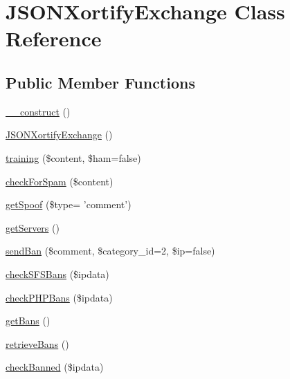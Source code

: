 \hypertarget{class_j_s_o_n_xortify_exchange}{\section{J\-S\-O\-N\-Xortify\-Exchange Class Reference}
\label{class_j_s_o_n_xortify_exchange}
}
\subsection*{Public Member Functions}
\begin{DoxyCompactItemize}
\item 
\hyperlink{class_j_s_o_n_xortify_exchange_a095c5d389db211932136b53f25f39685}{\-\_\-\-\_\-construct} ()
\item 
\hyperlink{class_j_s_o_n_xortify_exchange_a5b94fbd0db11c88aaac5a4d6025957c5}{J\-S\-O\-N\-Xortify\-Exchange} ()
\item 
\hyperlink{class_j_s_o_n_xortify_exchange_a3b3be735e633ba330c6b5d086aa508cd}{training} (\$content, \$ham=false)
\item 
\hyperlink{class_j_s_o_n_xortify_exchange_a7a4f53c3841dc7806455261af557d514}{check\-For\-Spam} (\$content)
\item 
\hyperlink{class_j_s_o_n_xortify_exchange_ae7926cba79660f77479306100f492c03}{get\-Spoof} (\$type= 'comment')
\item 
\hyperlink{class_j_s_o_n_xortify_exchange_a882f365bc81e207dc2123ef707735e82}{get\-Servers} ()
\item 
\hyperlink{class_j_s_o_n_xortify_exchange_a0293acfa4afe0cb5b2816352a35d8ca7}{send\-Ban} (\$comment, \$category\-\_\-id=2, \$ip=false)
\item 
\hyperlink{class_j_s_o_n_xortify_exchange_a985a563a84e3e5c54694fcce192bda53}{check\-S\-F\-S\-Bans} (\$ipdata)
\item 
\hyperlink{class_j_s_o_n_xortify_exchange_aeb1bf9aaee4718870adbd07333490aaf}{check\-P\-H\-P\-Bans} (\$ipdata)
\item 
\hyperlink{class_j_s_o_n_xortify_exchange_aea26db2906896833d32445a698fc4cdc}{get\-Bans} ()
\item 
\hyperlink{class_j_s_o_n_xortify_exchange_a4af29af927aae9aada97ef0c2cd08fa1}{retrieve\-Bans} ()
\item 
\hyperlink{class_j_s_o_n_xortify_exchange_ae41df0f26620b727f7f63342648f6474}{check\-Banned} (\$ipdata)
\end{DoxyCompactItemize}
